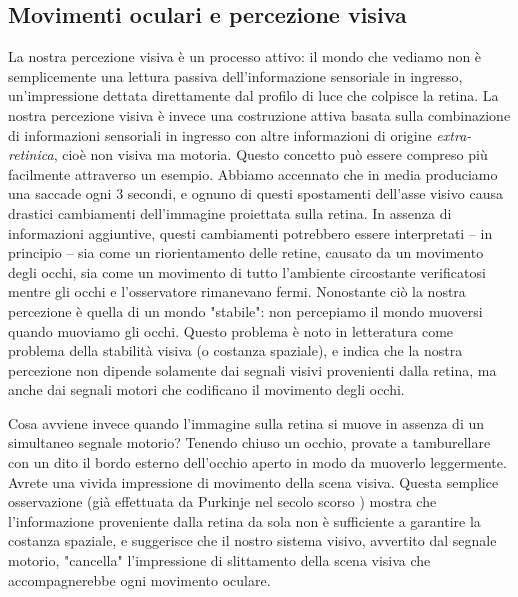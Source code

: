 \documentclass[12pt]{article}
\begin{document}
\subsection{Movimenti oculari e percezione visiva}
La nostra percezione visiva è un processo attivo: il mondo che vediamo non è semplicemente una lettura passiva dell'informazione sensoriale in ingresso, un'impressione dettata direttamente dal profilo di luce che colpisce la retina. La nostra percezione visiva è invece una costruzione attiva basata sulla combinazione di informazioni sensoriali in ingresso con altre informazioni di origine \textit{extra-retinica}, cioè non visiva ma motoria. Questo concetto può essere compreso più facilmente attraverso un esempio. Abbiamo accennato che in media produciamo una saccade ogni 3 secondi, e ognuno di questi spostamenti dell'asse visivo causa drastici cambiamenti dell'immagine proiettata sulla retina. In assenza di informazioni aggiuntive, questi cambiamenti potrebbero essere interpretati – in principio – sia come un riorientamento delle retine, causato da un movimento degli occhi, sia come un movimento di tutto l'ambiente circostante verificatosi mentre gli occhi e l'osservatore rimanevano fermi. Nonostante ciò la nostra percezione è quella di un mondo "stabile": non percepiamo il mondo muoversi quando muoviamo gli occhi. Questo problema è noto in letteratura come problema della stabilità visiva (o costanza spaziale), e indica che la nostra percezione non dipende solamente dai segnali visivi provenienti dalla retina, ma anche dai segnali motori che codificano il movimento degli occhi. 

Cosa avviene invece quando l'immagine sulla retina si muove in assenza di un simultaneo segnale motorio? Tenendo chiuso un occhio, provate a tamburellare con un dito il bordo esterno dell'occhio aperto in modo da muoverlo leggermente. Avrete una vivida impressione di movimento della scena visiva. Questa semplice osservazione (già effettuata da Purkinje nel secolo scorso \cite{Purkinje1825}) mostra che l'informazione proveniente dalla retina da sola non è sufficiente a garantire la costanza spaziale, e suggerisce che il nostro sistema visivo, avvertito dal segnale motorio, "cancella" l'impressione di slittamento della scena visiva che accompagnerebbe ogni movimento oculare. 
\end{document}
